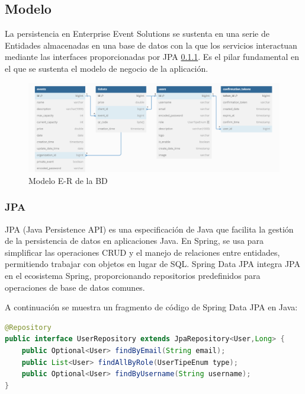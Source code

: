 \subsection{Modelo}
La persistencia en Enterprise Event Solutions se sustenta en una serie de Entidades almacenadas en una base de datos con la que los servicios interactuan mediante
las interfaces proporcionadas por JPA \ref{sec:jpa}. Es el pilar fundamental en el que se sustenta el modelo de negocio de la aplicación.
\begin{figure}[h]
    \centering
    \includegraphics[width=1.2\textwidth]{EVSdiagra.png} 
    \caption{Modelo E-R de la BD}
    \label{fig:diagramaBD}
\end{figure}

\subsubsection{JPA}
\label{sec:jpa}

JPA (Java Persistence API) es una especificación de Java que facilita la gestión de la persistencia de datos en aplicaciones Java.
En Spring, se usa para simplificar las operaciones CRUD y el manejo de relaciones entre entidades, permitiendo trabajar con objetos en lugar de SQL. 
Spring Data JPA integra JPA en el ecosistema Spring, proporcionando repositorios predefinidos para operaciones de base de datos comunes.

A continuación se muestra un fragmento de código de Spring Data JPA en Java:
\myjavastyle
\begin{lstlisting}[language=Java, caption=Ejemplo de Repositorio en Spring Data JPA]
@Repository
public interface UserRepository extends JpaRepository<User,Long> {
    public Optional<User> findByEmail(String email);
    public List<User> findAllByRole(UserTipeEnum type);
    public Optional<User> findByUsername(String username);
}
\end{lstlisting}


